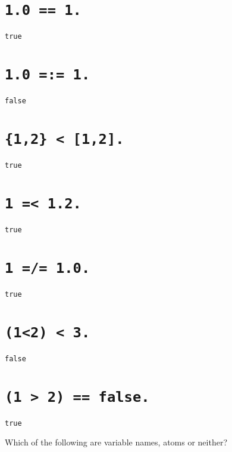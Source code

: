 \begin{questions}
\begin{parts}
        \part[1] {\tt 1.0 == 1.}
        \begin{solution}
            {\tt true}
        \end{solution}
        \part[1] {\tt 1.0 =:= 1.}
        \begin{solution}
            {\tt false}
        \end{solution}
        \part[1] {\tt \{1,2\} < [1,2].}
        \begin{solution}
            {\tt true}
        \end{solution}
        \part[1] {\tt 1 =< 1.2.}
        \begin{solution}
            {\tt true}
        \end{solution}
        \part[1] {\tt 1 =/= 1.0.}
        \begin{solution}
            {\tt true}
        \end{solution}
        \part[1] {\tt (1<2) < 3.}
        \begin{solution}
            {\tt false}
        \end{solution}
        \part[1] {\tt (1 > 2) == false.}
        \begin{solution}
            {\tt true}
        \end{solution}
    \end{parts}

    \question[4] Which of the following are variable names, atoms or
    neither?


\end{questions}

